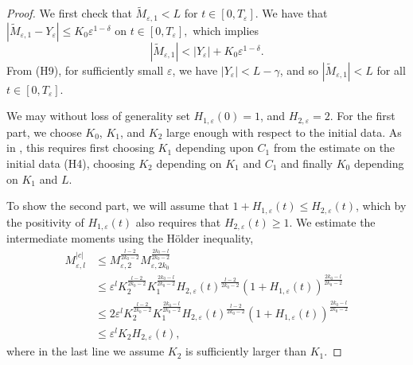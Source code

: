 \documentclass[]{article}
\theoremstyle{remark}
\begin{document}
 \begin{proof}

 We first check that $\widetilde{M}_{\varepsilon,1}<L$ for $t\in[0,T_\varepsilon]$.   We have that
 $|\widetilde{M}_{\varepsilon,1}-Y_\varepsilon|\leq{}K_0\varepsilon^{1-\delta} \text{ on } t\in[0,T_\varepsilon],$
  which implies 
  \[
  |\widetilde{M}_{\varepsilon,1}|<|Y_\varepsilon|+K_0\varepsilon^{1-\delta}.
  \] 
From (H9), for sufficiently small $\varepsilon$, we have $|Y_\varepsilon|<L-\gamma$, and so $|\widetilde{M}_{\varepsilon,1}|<L$ for all $t\in[0,T_\varepsilon]$.

We may without loss of generality set $H_{1,\varepsilon}(0)=1$, and $H_{2,\varepsilon}=2$. For the first part, we choose $K_0$, $K_1$, and $K_2$ large enough with respect to the initial data. As in \cite{GHM}, this requires first choosing $K_1$ depending upon $C_1$ from the estimate on the initial data (H4), choosing $K_2$ depending on $K_1$ and $C_1$ and finally $K_0$ depending on $K_1$ and $L$.
 
 To show the second part, we will assume that $1+H_{1,\varepsilon}(t)\leq{}H_{2,\varepsilon}(t)$, which by the positivity of $H_{1,\varepsilon}(t)$ also requires that $H_{2,\varepsilon}(t)\geq{}1$. We  estimate the intermediate moments using the H\"{o}lder inequality,
\begin{align*}
M_{\varepsilon,l}^{|c|}&\leq{}M_{\varepsilon,2}^\frac{l-2}{2k_0-2}M_{\varepsilon,2k_0}^\frac{2k_0-l}{2k_0-2}\\
&\leq{}\varepsilon^{l}K_{2}^\frac{l-2}{2k_0-2}K_{1}^\frac{2k_0-l}{2k_0-2}H_{2,\varepsilon}(t)^\frac{l-2}{2k_0-2}(1+H_{1,\varepsilon}(t))^\frac{2k_0-l}{2k_0-2}\\
&\leq{}2\varepsilon^{l}K_{2}^\frac{l-2}{2k_0-2}K_{1}^\frac{2k_0-l}{2k_0-2}H_{2,\varepsilon}(t)^\frac{l-2}{2k_0-2}(1+H_{1,\varepsilon}(t))^\frac{2k_0-l}{2k_0-2}\\
&\leq{}\varepsilon^{l}K_{2}H_{2,\varepsilon}(t),
\end{align*}
where in the last line we assume $K_2$ is sufficiently larger than $K_1$.


\end{proof}
\end{document}
